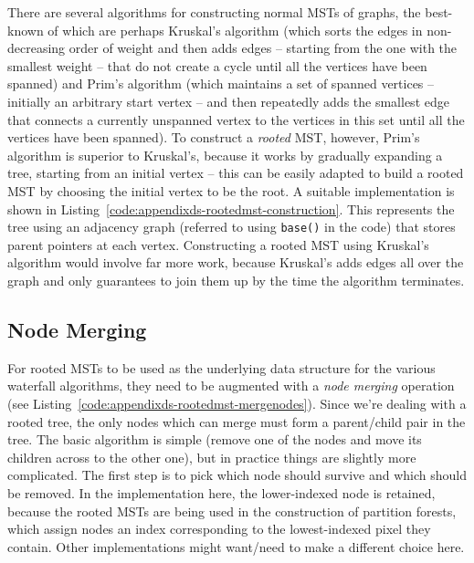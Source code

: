 \afterpage{\clearpage}

There are several algorithms for constructing normal MSTs of graphs, the best-known of which are perhaps Kruskal's algorithm (which sorts the edges in non-decreasing order of weight and then adds edges -- starting from the one with the smallest weight -- that do not create a cycle until all the vertices have been spanned) and Prim's algorithm (which maintains a set of spanned vertices -- initially an arbitrary start vertex -- and then repeatedly adds the smallest edge that connects a currently unspanned vertex to the vertices in this set until all the vertices have been spanned). To construct a \emph{rooted} MST, however, Prim's algorithm is superior to Kruskal's, because it works by gradually expanding a tree, starting from an initial vertex -- this can be easily adapted to build a rooted MST by choosing the initial vertex to be the root. A suitable implementation is shown in Listing~\ref{code:appendixds-rootedmst-construction}. This represents the tree using an adjacency graph (referred to using \texttt{base()} in the code) that stores parent pointers at each vertex. Constructing a rooted MST using Kruskal's algorithm would involve far more work, because Kruskal's adds edges all over the graph and only guarantees to join them up by the time the algorithm terminates.

\subsection{Node Merging}

For rooted MSTs to be used as the underlying data structure for the various waterfall algorithms, they need to be augmented with a \emph{node merging} operation (see Listing~\ref{code:appendixds-rootedmst-mergenodes}). Since we're dealing with a rooted tree, the only nodes which can merge must form a parent/child pair in the tree. The basic algorithm is simple (remove one of the nodes and move its children across to the other one), but in practice things are slightly more complicated. The first step is to pick which node should survive and which should be removed. In the implementation here, the lower-indexed node is retained, because the rooted MSTs are being used in the construction of partition forests, which assign nodes an index corresponding to the lowest-indexed pixel they contain. Other implementations might want/need to make a different choice here.

